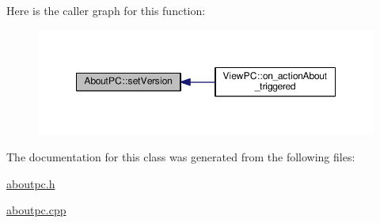 Here is the caller graph for this function\-:
\nopagebreak
\begin{figure}[H]
\begin{center}
\leavevmode
\includegraphics[width=350pt]{class_about_p_c_aa3815d4826d0c8d87122449537a0a4d5_icgraph}
\end{center}
\end{figure}




The documentation for this class was generated from the following files\-:\begin{DoxyCompactItemize}
\item 
\hyperlink{aboutpc_8h}{aboutpc.\-h}\item 
\hyperlink{aboutpc_8cpp}{aboutpc.\-cpp}\end{DoxyCompactItemize}
